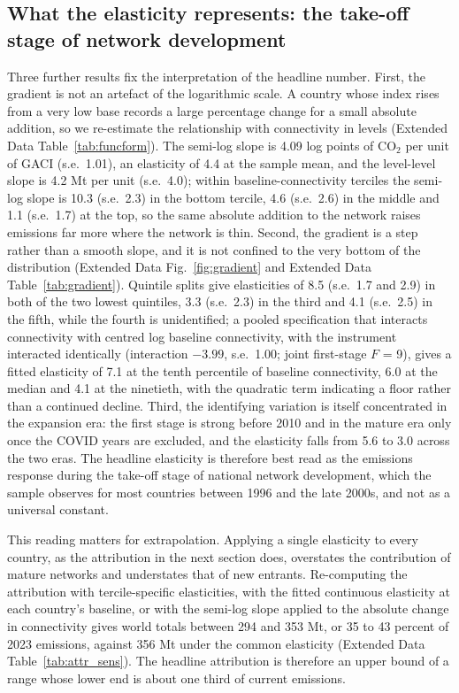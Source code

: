 \documentclass[12pt]{article}
\begin{document}
\subsection*{What the elasticity represents: the take-off stage of network
development}
Three further results fix the interpretation of the headline number. First,
the gradient is not an artefact of the logarithmic scale. A country whose
index rises from a very low base records a large percentage change for a
small absolute addition, so we re-estimate the relationship with
connectivity in levels (Extended Data Table~\ref{tab:funcform}). The
semi-log slope is 4.09 log points of CO$_2$ per unit of GACI (s.e.\ 1.01),
an elasticity of 4.4 at the sample mean, and the level-level slope is 4.2
Mt per unit (s.e.\ 4.0); within baseline-connectivity terciles the
semi-log slope is 10.3 (s.e.\ 2.3) in the bottom tercile, 4.6 (s.e.\ 2.6)
in the middle and 1.1 (s.e.\ 1.7) at the top, so the same absolute addition to the network raises emissions far
more where the network is thin. Second, the gradient is a step rather than
a smooth slope, and it is not confined to the very bottom of the
distribution (Extended Data Fig.~\ref{fig:gradient} and Extended Data
Table~\ref{tab:gradient}). Quintile splits give elasticities of 8.5 (s.e.\ 1.7 and 2.9) in
both of the two lowest quintiles, 3.3 (s.e.\ 2.3) in the third and 4.1
(s.e.\ 2.5) in the fifth, while the fourth is unidentified; a pooled
specification that interacts connectivity with centred log baseline
connectivity, with the instrument interacted identically (interaction
$-3.99$, s.e.\ 1.00; joint first-stage $F$ = 9), gives a fitted elasticity
of 7.1 at the tenth percentile of baseline connectivity, 6.0 at the median
and 4.1 at the ninetieth, with the quadratic term indicating a floor
rather than a continued decline. Third, the identifying variation is itself
concentrated in the expansion era: the first stage is strong before 2010
and in the mature era only once the COVID years are excluded, and the
elasticity falls from 5.6 to 3.0 across the two eras. The headline
elasticity is therefore best read as the emissions response during the
take-off stage of national network development, which the sample
observes for most countries between 1996 and the late 2000s, and not as a
universal constant.


This reading matters for extrapolation. Applying a single elasticity to
every country, as the attribution in the next section does, overstates the
contribution of mature networks and understates that of new entrants.
Re-computing the attribution with tercile-specific elasticities, with the
fitted continuous elasticity at each country's baseline, or with the
semi-log slope applied to the absolute change in connectivity gives world
totals between 294 and 353 Mt, or 35 to 43 percent of 2023 emissions,
against 356 Mt under the common elasticity (Extended Data
Table~\ref{tab:attr_sens}). The headline attribution is therefore an upper
bound of a range whose lower end is about one third of current emissions.
\end{document}
